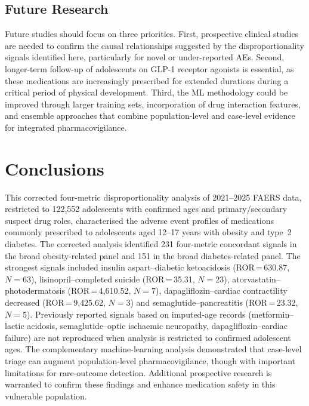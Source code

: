 \documentclass[10pt,a4paper]{article}
\begin{document}
\subsection{Future Research}
Future studies should focus on three priorities. First, prospective clinical studies are needed to confirm the causal relationships suggested by the disproportionality signals identified here, particularly for novel or under-reported AEs. Second, longer-term follow-up of adolescents on GLP-1 receptor agonists is essential, as these medications are increasingly prescribed for extended durations during a critical period of physical development. Third, the ML methodology could be improved through larger training sets, incorporation of drug interaction features, and ensemble approaches that combine population-level and case-level evidence for integrated pharmacovigilance.


\section{Conclusions}

This corrected four-metric disproportionality analysis of 2021--2025 FAERS data, restricted to 122,552 adolescents with confirmed ages and primary/secondary suspect drug roles, characterised the adverse event profiles of medications commonly prescribed to adolescents aged 12--17 years with obesity and type~2 diabetes. The corrected analysis identified 231 four-metric concordant signals in the broad obesity-related panel and 151 in the broad diabetes-related panel. The strongest signals included insulin aspart--diabetic ketoacidosis (ROR\,=\,630.87, $N=63$), lisinopril--completed suicide (ROR\,=\,35.31, $N=23$), atorvastatin--photodermatosis (ROR\,=\,4{,}610.52, $N=7$), dapagliflozin--cardiac contractility decreased (ROR\,=\,9{,}425.62, $N=3$) and semaglutide--pancreatitis (ROR\,=\,23.32, $N=5$). Previously reported signals based on imputed-age records (metformin--lactic acidosis, semaglutide--optic ischaemic neuropathy, dapagliflozin--cardiac failure) are not reproduced when analysis is restricted to confirmed adolescent ages. The complementary machine-learning analysis demonstrated that case-level triage can augment population-level pharmacovigilance, though with important limitations for rare-outcome detection. Additional prospective research is warranted to confirm these findings and enhance medication safety in this vulnerable population.
\end{document}
